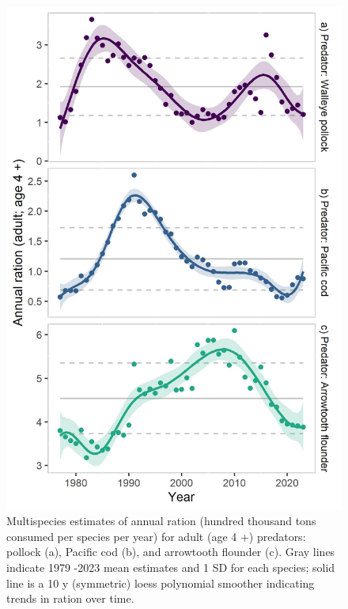 \documentclass[
]{article}
\begin{document}
\begin{figure}
\centering
\includegraphics{Results/ESR_Fig4.jpg}
\caption{Multispecies estimates of annual ration (hundred thousand tons
consumed per species per year) for adult (age 4 +) predators: pollock
(a), Pacific cod (b), and arrowtooth flounder (c). Gray lines indicate
1979 -2023 mean estimates and 1 SD for each species; solid line is a 10
y (symmetric) loess polynomial smoother indicating trends in ration over
time.}
\end{figure}
\end{document}

